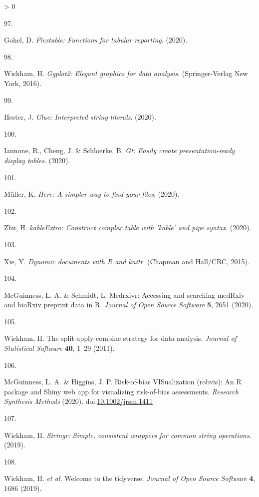 \documentclass[a4paper, twoside]{templates/ociamthesis}
\newlength{\cslhangindent}
\newlength{\csllabelwidth}
\newenvironment{CSLReferences}[3] %
 {%
  \setlength{\parindent}{0pt}
  \ifodd #1 \everypar{\setlength{\hangindent}{\cslhangindent}}\ignorespaces\fi
  \ifnum #2 > 0
  \setlength{\parskip}{#2\baselineskip}
  \fi
 }%
 {}
\newcommand{\CSLLeftMargin}[1]{\parbox[t]{\maxof{\widthof{#1}}{\csllabelwidth}}{#1}}
\newcommand{\CSLRightInline}[1]{\parbox[t]{\linewidth - \csllabelwidth}{#1}}
\begin{document}
\begin{CSLReferences}{0}{0}
\leavevmode\hypertarget{ref-flextable}{}%
\CSLLeftMargin{97. }
\CSLRightInline{Gohel, D. \emph{Flextable: {Functions} for tabular reporting}. (2020).}

\leavevmode\hypertarget{ref-ggplot2}{}%
\CSLLeftMargin{98. }
\CSLRightInline{Wickham, H. \emph{Ggplot2: {Elegant} graphics for data analysis}. ({Springer-Verlag New York}, 2016).}

\leavevmode\hypertarget{ref-glue}{}%
\CSLLeftMargin{99. }
\CSLRightInline{Hester, J. \emph{Glue: {Interpreted} string literals}. (2020).}

\leavevmode\hypertarget{ref-gt}{}%
\CSLLeftMargin{100. }
\CSLRightInline{Iannone, R., Cheng, J. \& Schloerke, B. \emph{Gt: {Easily} create presentation-ready display tables}. (2020).}

\leavevmode\hypertarget{ref-here}{}%
\CSLLeftMargin{101. }
\CSLRightInline{Müller, K. \emph{Here: {A} simpler way to find your files}. (2020).}

\leavevmode\hypertarget{ref-kableExtra}{}%
\CSLLeftMargin{102. }
\CSLRightInline{Zhu, H. \emph{{kableExtra}: {Construct} complex table with 'kable' and pipe syntax}. (2020).}

\leavevmode\hypertarget{ref-knitr}{}%
\CSLLeftMargin{103. }
\CSLRightInline{Xie, Y. \emph{Dynamic documents with {R} and knitr}. ({Chapman and Hall/CRC}, 2015).}

\leavevmode\hypertarget{ref-medrxivr}{}%
\CSLLeftMargin{104. }
\CSLRightInline{McGuinness, L. A. \& Schmidt, L. Medrxivr: {Accessing} and searching {medRxiv} and {bioRxiv} preprint data in {R}. \emph{Journal of Open Source Software} \textbf{5}, 2651 (2020).}

\leavevmode\hypertarget{ref-plyr}{}%
\CSLLeftMargin{105. }
\CSLRightInline{Wickham, H. The split-apply-combine strategy for data analysis. \emph{Journal of Statistical Software} \textbf{40}, 1--29 (2011).}

\leavevmode\hypertarget{ref-robvis}{}%
\CSLLeftMargin{106. }
\CSLRightInline{McGuinness, L. A. \& Higgins, J. P. Risk-of-bias {VISualization} (robvis): {An R} package and {Shiny} web app for visualizing risk-of-bias assessments. \emph{Research Synthesis Methods} (2020). doi:\href{https://doi.org/10.1002/jrsm.1411}{10.1002/jrsm.1411}}

\leavevmode\hypertarget{ref-stringr}{}%
\CSLLeftMargin{107. }
\CSLRightInline{Wickham, H. \emph{Stringr: {Simple}, consistent wrappers for common string operations}. (2019).}

\leavevmode\hypertarget{ref-tidyverse}{}%
\CSLLeftMargin{108. }
\CSLRightInline{Wickham, H. \emph{et al.} Welcome to the {tidyverse}. \emph{Journal of Open Source Software} \textbf{4}, 1686 (2019).}


\end{CSLReferences}
\end{document}
